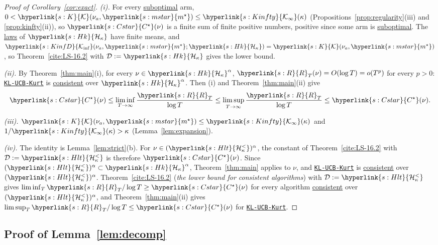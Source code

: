 \documentclass[11pt]{article}
\newcommand{\sy}[2]{{\hyperlink{#1}{#2}}}
\newcommand{\term}[2]{\hyperlink{#1}{#2}}
\newcommand{\mstar}{\sy{s:mstar}{m^{\star}}}
\newcommand{\Kinf}{\sy{s:KinfD}{\mathcal{K}_{\inf}}}
\newcommand{\Hk}{\sy{s:Hk}{\mathcal{H}_{\kappa}}}
\newcommand{\Hlt}{\sy{s:Hlt}{\mathcal{H}^{<}_{\kappa}}}
\newcommand{\Kc}{\sy{s:K}{\mathcal{K}}}
\newcommand{\Kinfty}{\sy{s:Kinfty}{\mathcal{K}_{\infty}}}
\newcommand{\Reg}{\sy{s:R}{R}}
\newcommand{\Cst}{\sy{s:Cstar}{C^{\star}}}
\newcommand{\algo}{\hyperref[alg:kucb]{\texttt{KL-UCB-Kurt}}}
\begin{document}
\begin{proof}[Proof of Corollary~\ref{cor:exact}]
\emph{(i).} For every \term{w:subopt}{suboptimal} arm, $0<\Kc(\nu_a,\mstar)\le\Kinfty(\kappa)$ (Propositions~\ref{prop:regularity}(iii) and
\ref{prop:kinfty}(ii)), so $\Cst(\nu)$ is a finite sum of finite positive numbers, positive since some arm is
\term{w:subopt}{suboptimal}. The \term{w:law}{laws} of $\Hk$ have finite means, and $\Kinf(\nu_a,\mstar;\Hk)=\Kc(\nu_a,\mstar)$, so
Theorem~\ref{cite:LS-16.2} with $\mathcal D:=\Hk$ gives the lower bound.

\emph{(ii).} By Theorem~\ref{thm:main}(i), for every $\nu\in\Hk^\alpha$, $\Reg_T(\nu)=O(\log T)=o(T^p)$ for every $p>0$: \algo{}
is \term{w:consistent}{consistent} over $\Hk^\alpha$. Then (i) and Theorem~\ref{thm:main}(ii) give
\begin{equation*}
  \Cst(\nu)\le\liminf_{T\to\infty}\frac{\Reg_T}{\log T}\le\limsup_{T\to\infty}\frac{\Reg_T}{\log T}\le\Cst(\nu).
\end{equation*}

\emph{(iii).} $\Kc(\nu_a,\mstar)\le\Kinfty(\kappa)$ and $1/\Kinfty(\kappa)>\kappa$ (Lemma~\ref{lem:expansion}).

\emph{(iv).} The identity is Lemma~\ref{lem:strict}(b). For $\nu\in(\Hlt)^\alpha$, the constant of
Theorem~\ref{cite:LS-16.2} with $\mathcal D:=\Hlt$ is therefore $\Cst(\nu)$. Since $(\Hlt)^\alpha\subset\Hk^\alpha$,
Theorem~\ref{thm:main} applies to $\nu$, and \algo{} is \term{w:consistent}{consistent} over $(\Hlt)^\alpha$. Theorem~\ref{cite:LS-16.2}
(\emph{the lower bound for consistent algorithms}) with $\mathcal D:=\Hlt$ gives $\liminf_T\Reg_T/\log T\ge\Cst(\nu)$ for every algorithm
\term{w:consistent}{consistent} over $(\Hlt)^\alpha$, and Theorem~\ref{thm:main}(ii) gives $\limsup_T\Reg_T/\log T\le\Cst(\nu)$ for \algo{}.
\end{proof}

\subsection{Proof of Lemma~\ref{lem:decomp}}\label{sec:proof-lem-decomp}
\end{document}
